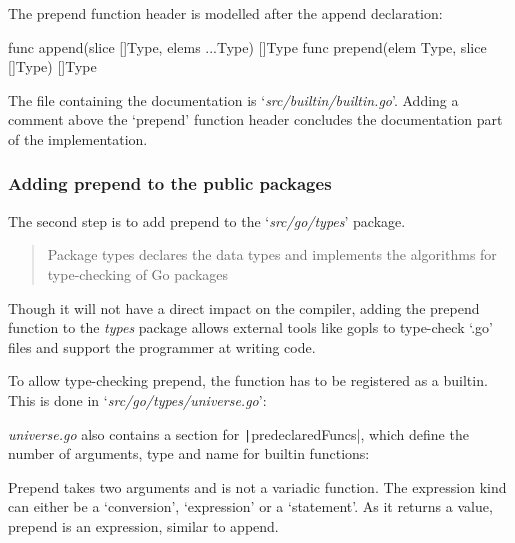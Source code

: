 The prepend function header is modelled after the append declaration:
\begin{code}
\begin{gocode}
func append(slice []Type, elems ...Type) []Type
func prepend(elem Type, slice []Type) []Type
\end{gocode}
\end{code}

The file containing the documentation is `\textit{src/builtin/builtin.go}'.
Adding a comment above the `prepend' function header concludes the documentation
part of the implementation.

\subsubsection{Adding prepend to the public packages}

The second step is to add prepend to the `\textit{src/go/types}' package.
\begin{quote}
    Package types declares the data types and implements the algorithms for
    type-checking of Go packages
\end{quote}\cite{godoc-types}

Though it will not have a direct impact on the compiler, adding the prepend function
to the \textit{types} package allows external tools like \gls{gopls}
to type-check `.go' files and support the programmer
at writing code.

To allow type-checking prepend, the function has to be registered as a builtin.
This is done in `\textit{src/go/types/universe.go}':

\begin{code}
\end{code}

\textit{universe.go} also contains a section for \texttt|predeclaredFuncs|, which
define the number of arguments, type and name for builtin functions:

\begin{code}
\end{code}

Prepend takes two arguments and is not a variadic function. The expression kind can either be a `conversion',
`expression' or a `statement'.
As it returns a value, prepend is an expression, similar to append.

